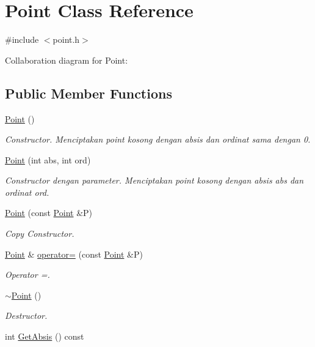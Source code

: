 \hypertarget{classPoint}{}\section{Point Class Reference}
\label{classPoint}


{\ttfamily \#include $<$point.\+h$>$}



Collaboration diagram for Point\+:
\subsection*{Public Member Functions}
\begin{DoxyCompactItemize}
\item 
\hyperlink{classPoint_ad92f2337b839a94ce97dcdb439b4325a}{Point} ()
\begin{DoxyCompactList}\small\item\em Constructor. Menciptakan point kosong dengan absis dan ordinat sama dengan 0. \end{DoxyCompactList}\item 
\hyperlink{classPoint_a3634e1e4d94c1268ddaca3909f23b39b}{Point} (int abs, int ord)
\begin{DoxyCompactList}\small\item\em Constructor dengan parameter. Menciptakan point kosong dengan absis abs dan ordinat ord. \end{DoxyCompactList}\item 
\hyperlink{classPoint_a7e32c5a7f878c49ed9f1777b622cc06c}{Point} (const \hyperlink{classPoint}{Point} \&P)
\begin{DoxyCompactList}\small\item\em Copy Constructor. \end{DoxyCompactList}\item 
\hyperlink{classPoint}{Point} \& \hyperlink{classPoint_a24f658e4631df755120d856de77e3cbb}{operator=} (const \hyperlink{classPoint}{Point} \&P)
\begin{DoxyCompactList}\small\item\em Operator =. \end{DoxyCompactList}\item 
\hyperlink{classPoint_a395fa04b4ec126b66fc053f829a30cc1}{$\sim$\+Point} ()
\begin{DoxyCompactList}\small\item\em Destructor. \end{DoxyCompactList}\item 
int \hyperlink{classPoint_af9d064339ffb2f87abb6574dbfc9cdb2}{Get\+Absis} () const 

\end{DoxyCompactItemize}
